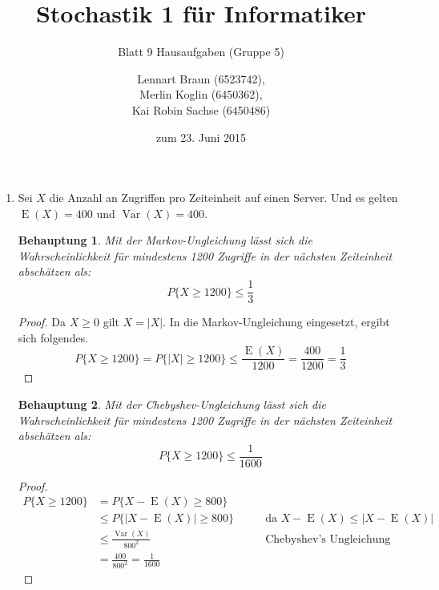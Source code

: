 \documentclass[a4paper]{scrartcl}
\title{Stochastik 1 für Informatiker}
\subtitle{Blatt 9 Hausaufgaben (Gruppe 5)}
\author{
    Lennart Braun (6523742), \\
    Merlin Koglin (6450362), \\
    Kai Robin Sachse (6450486)
}
\date{zum 23. Juni 2015}
\newtheorem*{behaupt}{Behauptung}
\newcommand{\e}{\operatorname{E}}
\newcommand{\var}{\operatorname{Var}}
\begin{document}
\maketitle

\begin{enumerate}[label=\bfseries\arabic*.]
    \item
        Sei $X$ die Anzahl an Zugriffen pro Zeiteinheit auf einen Server.
        Und es gelten $\e(X) = 400$ und $\var(X) = 400$.
        \begin{behaupt}
            Mit der Markov-Ungleichung lässt sich die Wahrscheinlichkeit für
            mindestens 1200 Zugriffe in der nächsten Zeiteinheit abschätzen als:
            \begin{equation*}
                P\{X \geq 1200\} \leq \frac{1}{3}
            \end{equation*}
        \end{behaupt}
        \begin{proof}
            Da $X \geq 0$ gilt $X = |X|$.
            In die Markov-Ungleichung eingesetzt, ergibt sich folgendes.
            \begin{equation*}
                P\{X \geq 1200\} = P\{|X| \geq 1200\}
                \leq \frac{\e(X)}{1200} = \frac{400}{1200} = \frac{1}{3}
            \end{equation*}
        \end{proof}

        \begin{behaupt}
            Mit der Chebyshev-Ungleichung lässt sich die Wahrscheinlichkeit für
            mindestens 1200 Zugriffe in der nächsten Zeiteinheit abschätzen als:
            \begin{equation*}
                P\{X \geq 1200\} \leq \frac{1}{1600}
            \end{equation*}
        \end{behaupt}
        \begin{proof}
            \begin{equation*}
                \begin{alignedat}{2}
                    P\{X \geq 1200\} &= P\{X - \e(X) \geq 800\} \\
                                     &\leq P\{|X - \e(X)| \geq 800\}
                    \qquad &\text{da } X - \e(X) \leq |X - \e(X)| \\
                    &\leq \frac{\var(X)}{800^2}
                    \qquad &\text{Chebyshev's Ungleichung} \\
                    &= \frac{400}{800^2} = \frac{1}{1600}
                \end{alignedat}
            \end{equation*}
        \end{proof}


\end{enumerate}
\end{document}
